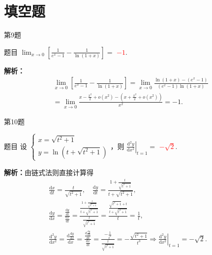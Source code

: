\documentclass[aspectratio=169]{beamer}
\begin{document}
\section{填空题}

\begin{frame}{第9题}
\begin{block}{题目}
$\displaystyle\lim_{x\to 0}\left[\frac{1}{e^x-1}-\frac{1}{\ln(1+x)}\right]=$ \underline{\textcolor{red}{$-1$}}.
\end{block}
\textbf{解析：}
\begin{align*}
&\lim_{x\rightarrow 0} \left[ \frac{1}{e^x-1}-\frac{1}{\ln \left( 1+x \right)} \right] =\lim_{x\rightarrow 0} \frac{\ln \left( 1+x \right) -\left( e^x-1 \right)}{\left( e^x-1 \right) \ln \left( 1+x \right)}
\\
&=\lim_{x\rightarrow 0} \frac{x-\frac{x^2}{2}+o\left( x^2 \right) -\left( x+\frac{x^2}{2}+o\left( x^2 \right) \right)}{x^2}=-1.
\end{align*}
\end{frame}

\begin{frame}{第10题}
\begin{block}{题目}
设 $\begin{cases}x=\sqrt{t^2+1}\\ y=\ln(t+\sqrt{t^2+1})\end{cases}$，则 $\left.\frac{\mathrm{d}^2y}{\mathrm{d}x^2}\right|_{t=1}=$ \underline{\textcolor{red}{$-\sqrt2$}}.
\end{block}
\textbf{解析：}由链式法则直接计算得
\begin{gather*}
\frac{\mathrm{d}x}{\mathrm{d}t}=\frac{t}{\sqrt{t^2+1}},\quad \frac{\mathrm{d}y}{\mathrm{d}t}=\frac{1+\frac{t}{\sqrt{t^2+1}}}{t+\sqrt{t^2+1}},
\\
\frac{\mathrm{d}y}{\mathrm{d}x}=\frac{\frac{\mathrm{d}y}{\mathrm{d}t}}{\frac{\mathrm{d}x}{\mathrm{d}t}}=\frac{\frac{1+\frac{t}{\sqrt{t^2+1}}}{t+\sqrt{t^2+1}}}{\frac{t}{\sqrt{t^2+1}}}=\frac{\frac{\sqrt{t^2+1}+t}{t+\sqrt{t^2+1}}}{t}=\frac{1}{t},
\\
\frac{\mathrm{d}^2y}{\mathrm{d}x^2}=\frac{\mathrm{d}\frac{\mathrm{d}y}{\mathrm{d}x}}{\mathrm{d}x}=\frac{\frac{\mathrm{d}\frac{\mathrm{d}y}{\mathrm{d}x}}{\mathrm{d}t}}{\frac{\mathrm{d}x}{\mathrm{d}t}}=\frac{-\frac{1}{t^2}}{\frac{t}{\sqrt{t^2+1}}}=-\frac{\sqrt{t^2+1}}{t^3}\Longrightarrow \left.\frac{\mathrm{d}^2y}{\mathrm{d}x^2}\right|_{t=1}=-\sqrt2.
\end{gather*}
\end{frame}
\end{document}
